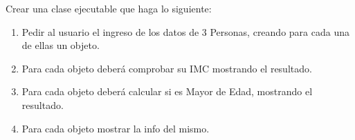 
Crear una clase ejecutable que haga lo siguiente:

\begin{enumerate}[label=\alph*), itemsep=0.5em]
    \item Pedir al usuario el ingreso de los datos de 3 Personas, creando para cada una de ellas un objeto.
    
    \item Para cada objeto deber\'a comprobar su IMC mostrando el resultado.
    
    \item Para cada objeto deber\'a calcular si es Mayor de Edad, mostrando el resultado.
    
    \item Para cada objeto mostrar la info del mismo.
\end{enumerate}

\newpage
{}


\volverindice
\newpage